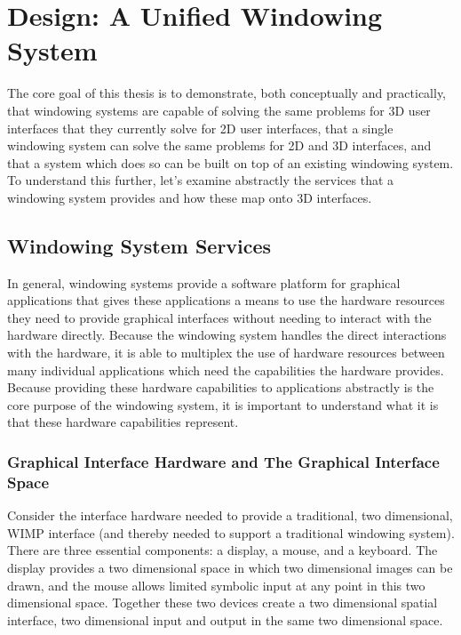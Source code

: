 \chapter{Design: A Unified Windowing System}
\label{sec:design}
The core goal of this thesis is to demonstrate, both conceptually and practically, that windowing systems are capable of solving the same problems for 3D user interfaces that they currently solve for 2D user interfaces, that a single windowing system can solve the same problems for 2D and 3D interfaces, and that a system which does so can be built on top of an existing windowing system. To understand this further, let's examine abstractly the services that a windowing system provides and how these map onto 3D interfaces.

\section{Windowing System Services}

In general, windowing systems provide a software platform for graphical applications that gives these applications a means to use the hardware resources they need to provide graphical interfaces without needing to interact with the hardware directly. Because the windowing system handles the direct interactions with the hardware, it is able to multiplex the use of hardware resources between many individual applications which need the capabilities the hardware provides. Because providing these hardware capabilities to applications abstractly is the core purpose of the windowing system, it is important to understand what it is that these hardware capabilities represent.

\subsection{Graphical Interface Hardware and The Graphical Interface Space}

Consider the interface hardware needed to provide a traditional, two dimensional, WIMP interface (and thereby needed to support a traditional windowing system). There are three essential components: a display, a mouse, and a keyboard. The display provides a two dimensional space in which two dimensional images can be drawn, and  the mouse allows limited symbolic input at any point in this two dimensional space. Together these two devices create a two dimensional spatial interface, two dimensional input and output in the same two dimensional space. 

